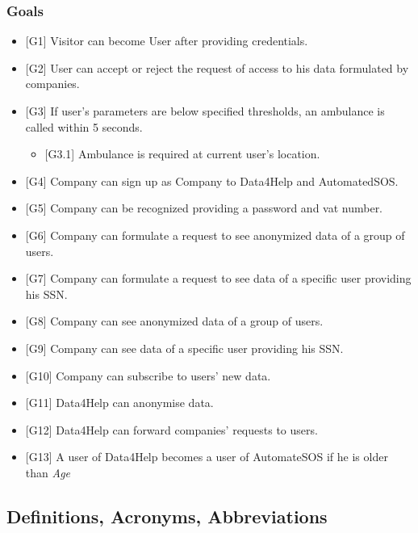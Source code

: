\documentclass{article}
\begin{document}
\subsubsection{Goals}
\begin{itemize}
	\item {[G1]} Visitor can become User after providing credentials.
	\item {[G2]} User can accept or reject the request of access to his data formulated by companies.
	\item {[G3]} If user's parameters are below specified thresholds, an ambulance is called within 5 seconds. 
	\begin{itemize}
		\item {[G3.1]} Ambulance is required at current user's location. 
	\end{itemize}
	\item {[G4]} Company can sign up as Company to Data4Help and AutomatedSOS. 
	\item {[G5]} Company can be recognized providing a password and vat number.
	\item {[G6]} Company can formulate a request to see anonymized data of a group of users.
	\item {[G7]} Company can formulate a request to see data of a specific user providing his SSN.
	\item {[G8]} Company can see anonymized data of a group of users.
	\item {[G9]} Company can see data of a specific user providing his SSN.
	\item {[G10]} Company can subscribe to users' new data.
	\item {[G11]} Data4Help can anonymise data.
	\item {[G12]} Data4Help can forward companies' requests to users. 
	\item {[G13]} A user of Data4Help becomes a user of AutomateSOS if he is older than \emph{Age}
\end{itemize} 
\subsection{Definitions, Acronyms, Abbreviations}
\end{document}
